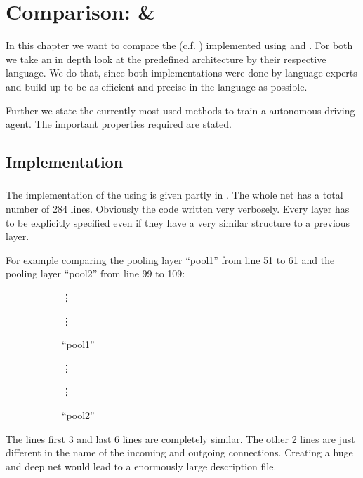 \chapter{Comparison: \cnnarch \& \caffe}

In this chapter we want to compare the \alexnet (c.f. ) implemented using \cnnarch and \caffe. For both we take an in depth look at the predefined architecture by their respective language. We do that, since both implementations were done by language experts and build up to be as efficient and precise in the language as possible.

Further we state the currently most used methods to train a autonomous driving agent. The important properties required are stated.

\section{Implementation} \label{sec: Implementation}

\subsection{\caffe} \label{subsec: Caffe Implementation}
The implementation of the \alexnet using \caffe is given partly in . The whole net has a total number of 284 lines. Obviously the code written very verbosely. Every layer has to be explicitly specified even if they have a very similar structure to a previous layer.

For example comparing the pooling layer ``pool1'' from line 51 to 61 and the pooling layer ``pool2'' from line 99 to 109:
\begin{figure}[H]
	\centering
	\begin{subfigure}[b]{0.45\textwidth}
		\hspace*{2cm}\vdots
		
		\hspace*{2cm}\vdots
		\caption{``pool1''}
		\label{lst: pool1}
	\end{subfigure}
	\begin{subfigure}[b]{0.45\textwidth}
		\hspace*{2cm}\vdots
		
		\hspace*{2cm}\vdots
		\caption{``pool2''}
		\label{lst: pool2}
	\end{subfigure}
	\caption{}
	\label{lst: pool1 and pool2}
\end{figure}
The lines first 3 and last 6 lines are completely similar. The other 2 lines are just different in the name of the incoming and outgoing connections. Creating a huge and deep net would lead to a enormously large description file. 

